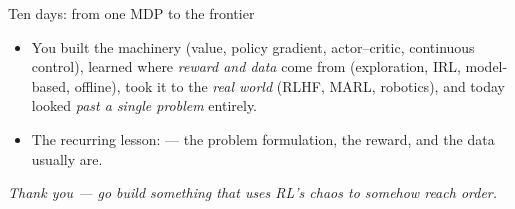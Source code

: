 \begin{frame}{Ten days: from one MDP to the frontier}
\begin{itemize}\itemsep0.5em
    \item You built the machinery (value, policy gradient, actor--critic, continuous
          control), learned where \emph{reward and data} come from (exploration, IRL,
          model-based, offline), took it to the \emph{real world} (RLHF, MARL, robotics),
          and today looked \emph{past a single problem} entirely.
    \item The recurring lesson:  --- the
          problem formulation, the reward, and the data usually are.
\end{itemize}
\vfill
\begin{center}\itshape
Thank you --- go build something that uses RL's \emph{chaos} to somehow reach \emph{order}.
\end{center}
\end{frame}

